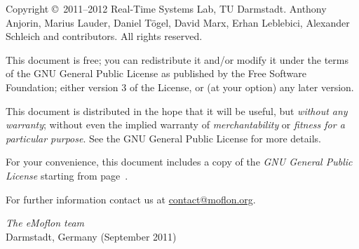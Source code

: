 \documentclass[11pt,a4paper, twoside]{book}
\begin{document}
   
  
\frontmatter   

\maketitle

\begin{small} 
Copyright \copyright~2011--2012 Real-Time Systems Lab, TU Darmstadt.
Anthony Anjorin, Marius Lauder, Daniel T\"ogel, David Marx, Erhan Leblebici, Alexander Schleich and contributors.
All rights reserved.

This document is free; you can redistribute it and/or modify it under the terms of the GNU General Public License as published by the Free Software Foundation; either version 3 of the License, or (at your option) any later version.
 
This document is distributed in the hope that it will be useful, but \emph{without any warranty}; without even the implied warranty of \emph{merchantability} or \emph{fitness for a particular purpose}.
See the GNU General Public License for more details.
 
For your convenience, this document includes a copy of the \emph{GNU General Public License} starting from page~\pageref{chap:gpl}.
  
For further information contact us at \href{mailto:contact@moflon.org}{contact@moflon.org}.
  
\vskip3cm
\textit{The eMoflon team}\\
Darmstadt, Germany (September 2011)
\end{small}


\tableofcontents

\setcounter{romanpages}{\value{page}}

\mainmatter
 












 

\end{document}
